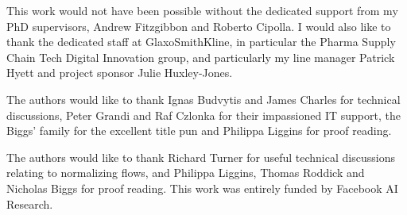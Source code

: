 
\begin{acknowledgements}      


This work would not have been possible without the dedicated support from my PhD supervisors, Andrew Fitzgibbon and Roberto Cipolla. I would also like to thank the dedicated staff at GlaxoSmithKline, in particular the Pharma Supply Chain Tech Digital Innovation group, and particularly my line manager Patrick Hyett and project sponsor Julie Huxley-Jones. 


The authors would like to thank Ignas Budvytis and James Charles for technical discussions, Peter Grandi and Raf Czlonka for their impassioned IT support, the Biggs' family for the excellent title pun and Philippa Liggins for proof reading.


The authors would like to thank Richard Turner for useful technical discussions relating to normalizing flows, and Philippa Liggins, Thomas Roddick and Nicholas Biggs for proof reading. This work was entirely funded by Facebook AI Research.


\end{acknowledgements}
